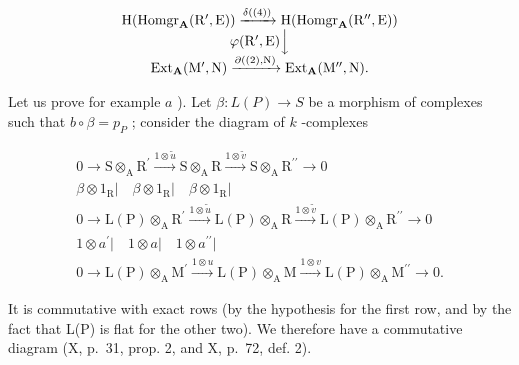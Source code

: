 \[
\begin{array}{c} \mathrm{H} (\operatorname{Homgr} _ {\mathbf {A}} (\mathrm{R} ^ {\prime}, \mathrm{E})) \xrightarrow {\delta ((4))} \mathrm{H} (\operatorname{Homgr} _ {\mathbf {A}} (\mathrm{R} ^ {\prime \prime}, \mathrm{E})) \\ \varphi (\mathrm{R} ^ {\prime}, \mathrm{E}) \Big \downarrow \\ \operatorname{Ext} _ {\mathbf {A}} (\mathrm{M} ^ {\prime}, \mathrm{N}) \xrightarrow {\partial ((2) , \mathrm{N})} \operatorname{Ext} _ {\mathbf {A}} (\mathrm{M} ^ {\prime \prime}, \mathrm{N}). \end{array}
\]

Let us prove for example \(a\) ). Let \(\beta: L(P) \to S\) be a morphism of complexes such that \(b \circ \beta = p_{P}\) ; consider the diagram of \(k\) -complexes

\[
\begin{array}{c}0 \rightarrow \mathrm{S} \otimes_ {\mathrm{A}} \mathrm{R} ^ {\prime} \xrightarrow {1 \otimes \tilde {u}} \mathrm{S} \otimes_ {\mathrm{A}} \mathrm{R} \xrightarrow {1 \otimes \tilde {v}} \mathrm{S} \otimes_ {\mathrm{A}} \mathrm{R} ^ {\prime \prime} \longrightarrow 0\\\beta \otimes 1 _ {\mathrm{R}} \Bigg | \quad \beta \otimes 1 _ {\mathrm{R}} \Bigg | \quad \beta \otimes 1 _ {\mathrm{R}} \Bigg |\\0 \rightarrow \mathrm{L(P)} \otimes_ {\mathrm{A}} \mathrm{R} ^ {\prime} \xrightarrow {1 \otimes \tilde {u}} \mathrm{L(P)} \otimes_ {\mathrm{A}} \mathrm{R} \xrightarrow {1 \otimes \tilde {v}} \mathrm{L(P)} \otimes_ {\mathrm{A}} \mathrm{R} ^ {\prime \prime} \longrightarrow 0\\1 \otimes a ^ {\prime} \Bigg | \quad 1 \otimes a \Bigg | \quad 1 \otimes a ^ {\prime \prime} \Bigg |\\0 \rightarrow \mathrm{L(P)} \otimes_ {\mathrm{A}} \mathrm{M} ^ {\prime} \xrightarrow {1 \otimes u} \mathrm{L(P)} \otimes_ {\mathrm{A}} \mathrm{M} \xrightarrow {1 \otimes v} \mathrm{L(P)} \otimes_ {\mathrm{A}} \mathrm{M} ^ {\prime \prime} \longrightarrow 0.\end{array}
\]

It is commutative with exact rows (by the hypothesis for the first row, and by the fact that L(P) is flat for the other two). We therefore have a commutative diagram (X, p.~31, prop. 2, and X, p.~72, def. 2).

